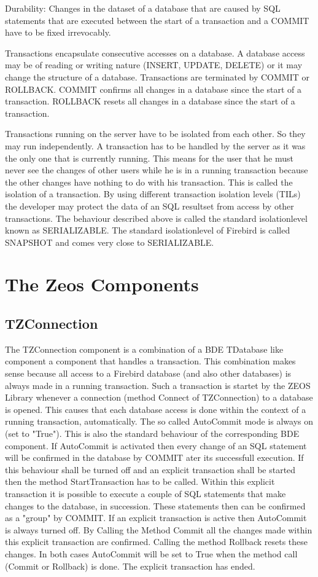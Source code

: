 \documentclass[a4paper,12pt,oneside]{book}
\begin{document}
Durability: Changes in the dataset of a database that are caused by SQL statements that are executed between the start of a transaction and a COMMIT have to be fixed irrevocably.

Transactions encapsulate consecutive accesses on a database.
A database access may be of reading or writing nature (INSERT, UPDATE, DELETE) or it may change the structure of a database.
Transactions are terminated by COMMIT or ROLLBACK.
COMMIT confirms all changes in a database since the start of a transaction.
ROLLBACK resets all changes in a database since the start of a transaction.

Transactions running on the server have to be isolated from each other.
So they may run independently.
A transaction has to be handled by the server as it was the only one that is currently running.
This means for the user that he must never see the changes of other users while he is in a running transaction because the other changes have nothing to do with his transaction.
This is called the isolation of a transaction.
By using different transaction isolation levels (TILs) the developer may protect the data of an SQL resultset from access by other transactions.
The behaviour described above is called the standard isolationlevel known as SERIALIZABLE.
The standard isolationlevel of Firebird is called SNAPSHOT and comes very close to SERIALIZABLE.

\section{The Zeos Components}

\subsection{TZConnection}
The TZConnection component is a combination of a BDE TDatabase like component a component that
handles a transaction.
This combination makes sense because all access to a Firebird database (and also other databases) is always made in a running transaction.
Such a transaction is startet by the ZEOS Library whenever a connection (method Connect of TZConnection) to a database is opened.
This causes that each database access is done within the context of a running transaction, automatically.
The so called AutoCommit mode is always on (set to "True").
This is also the standard behaviour of the corresponding BDE component.
If AutoCommit is activated then every change of an SQL statement will be confirmed in the
database by COMMIT ater its successfull execution.
If this behaviour shall be turned off and an explicit transaction shall be started then the method StartTransaction has to be called.
Within this explicit transaction it is possible to execute a couple of SQL statements that make changes to the database, in succession.
These statements then can be confirmed as a "group" by COMMIT.
If an explicit transaction is active then AutoCommit is always turned off.
By Calling the Method Commit all the changes made within this explicit transaction are confirmed.
Calling the method Rollback resets these changes.
In both cases AutoCommit will be set to True when the method call (Commit or Rollback) is done.
The explicit transaction has ended.
\end{document}
